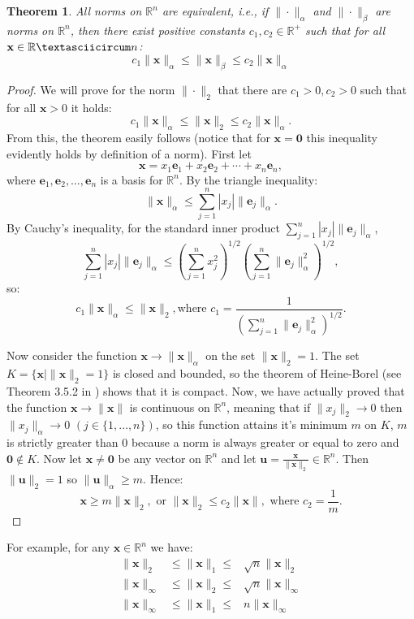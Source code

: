\documentclass[a4paper,11pt]{report}
\newtheorem{theorem}{Theorem}[section]
\newcommand{\R}{{\mathbb R}}
\begin{document}
\begin{theorem}\label{equivalencenorms}
  All norms on $\R^n$ are \emph{equivalent}, i.e., if $\|\cdot\|_\alpha$ and 
  $\|\cdot\|_\beta$ are norms on $\R^n$, then there exist positive constants $c_1, c_2 \in 
  \R^+$ such that for all $\mathbf{x} \in \Rˆn$:
  $$c_1 \|\mathbf{x}\|_\alpha \leq \|\mathbf{x}\|_\beta \leq c_2 
  \|\mathbf{x}\|_\alpha$$
  
  \end{theorem}
\begin{proof}
 We will prove for the norm $\|\cdot\|_2$ that there are $c_1>0, c_2>0$ such that 
 for all $\mathbf{x}>0$ it holds:
 $$c_1\|\mathbf{x}\|_\alpha \leq \|\mathbf{x}\|_2 \leq c_2 \|\mathbf{x}\|_\alpha.$$
 From this, the theorem easily follows (notice that for $\mathbf{x} = \mathbf{0}$ this inequality evidently holds by definition of a norm). First let
  $$\mathbf{x} = x_1\mathbf{e}_1 +x_2\mathbf{e}_2 + \cdots + x_n\mathbf{e}_n,$$
  where ${\mathbf{e}_1, \mathbf{e}_2, \ldots, \mathbf{e}_n}$ is a basis for 
  $\R^n$. By the triangle inequality:
  $$\|\mathbf{x}\|_\alpha \leq \sum^n_{j=1} |x_j|\|\mathbf{e}_j\|_\alpha.$$
  By Cauchy's inequality, for the standard inner product $\sum^n_{j=1} 
  |x_j|\|\mathbf{e}_j\|_\alpha$,
$$\sum^n_{j=1} |x_j|\|\mathbf{e}_j\|_\alpha \leq \left(\sum^n_{j=1} x^2_j\right)^{1/2}\left(\sum^n_{j=1} \|\mathbf{e}_j\|_\alpha^2\right)^{1/2},$$
  so:
  $$c_1\|\mathbf{x}\|_\alpha \leq \|\mathbf{x}\|_2, \text {where } c_1 = \frac{1}{\left(\sum^n_{j=1} \|\mathbf{e}_j\|_\alpha^2\right)^{1/2}}.$$
   
   Now consider the function $\mathbf{x} \to \|\mathbf{x}\|_\alpha$ on the set 
   $\|\mathbf{x}\|_2=1$. The set $K = \{\mathbf{x} \mid \|\mathbf{x}\|_2 = 1\}$ 
   is closed and bounded, so the theorem of Heine-Borel (see Theorem 3.5.2 in \cite{caenepeel}) 
   shows that it is compact. Now, we have actually proved that the function $\mathbf{x} \to \|\mathbf{x}\|$ 
   is continuous on $\R^n$, meaning that if $\|x_j\|_2 \to 0$ then $\|x_j\|_\alpha \to 0$ 
   $(j \in \{1,\ldots,n\})$, so this function attains it's minimum $m$ on $K$, $m$ is strictly greater than $0$ 
   because a norm is always greater or equal to zero and $\mathbf{0} \not\in K$. 
   Now let $\mathbf{x} \not = \mathbf{0}$ be any vector on $\R^n$ and let $\mathbf{u} = 
   \frac{\mathbf{x}}{\|\mathbf{x}\|_2} \in \R^n$. Then $\|\mathbf{u}\|_2 = 1$ so 
   $\|\mathbf{u}\|_\alpha \geq m$. Hence:
   $$\mathbf{x} \geq m\|\mathbf{x}\|_2, \text{ or } \|\mathbf{x}\|_2 \leq c_2 
   \|\mathbf{x}\|, \text{ where } c_2=\frac{1}{m}.$$

\end{proof}
For example, for any $\mathbf{x} \in \R^n$ we have:
\begin{eqnarray*}
  \|\mathbf{x}\|_2 &\leq \|\mathbf{x}\|_1 \leq& \sqrt{n}\|\mathbf{x}\|_2\\
   \|\mathbf{x}\|_\infty &\leq \|\mathbf{x}\|_2 \leq& \sqrt{n}\|\mathbf{x}\|_\infty\\
     \|\mathbf{x}\|_\infty &\leq \|\mathbf{x}\|_1 \leq& n\|\mathbf{x}\|_\infty
  \end{eqnarray*}
\end{document}
